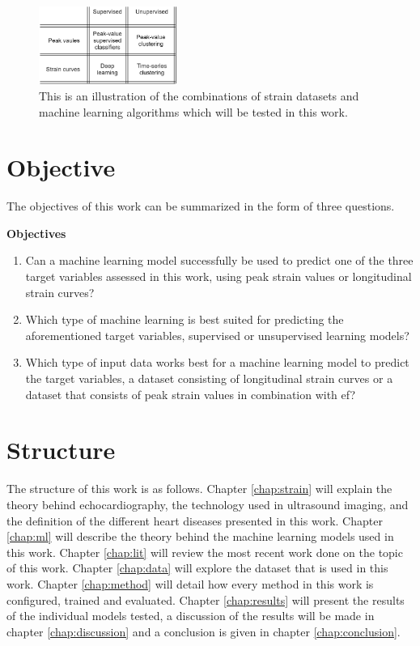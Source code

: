 \begin{figure}[H]
    \centering
    \includegraphics[width=0.4\textwidth]{intro/objectives_diagram.png}
    \caption{This is an illustration of the combinations of strain datasets and machine learning algorithms which will be tested in this work.}
    \label{fig:objectives_diagram}
\end{figure}

\section{Objective} \label{sec:objective}

The objectives of this work can be summarized in the form of three questions.

\begin{tcolorbox}
    \textbf{Objectives}

    \begin{enumerate}
        \item Can a machine learning model successfully be used to predict one of the three target variables assessed in this work, using peak strain values or longitudinal strain curves?
        \item Which type of machine learning is best suited for predicting the aforementioned target variables, supervised or unsupervised learning models?
        \item Which type of input data works best for a machine learning model to predict the target variables, a dataset consisting of longitudinal strain curves or a dataset that consists of peak strain values in combination with \acrshort{ef}?
    \end{enumerate}
\end{tcolorbox}

\section{Structure}

The structure of this work is as follows. Chapter \ref{chap:strain} will explain the theory behind echocardiography, the technology used in ultrasound imaging, and the definition of the different heart diseases presented in this work. Chapter \ref{chap:ml} will describe the theory behind the machine learning models used in this work. Chapter \ref{chap:lit} will review the most recent work done on the topic of this work. Chapter \ref{chap:data} will explore the dataset that is used in this work. Chapter \ref{chap:method} will detail how every method in this work is configured, trained and evaluated. Chapter \ref{chap:results} will present the results of the individual models tested, a discussion of the results will be made in chapter 
\ref{chap:discussion} and a conclusion is given in chapter \ref{chap:conclusion}.